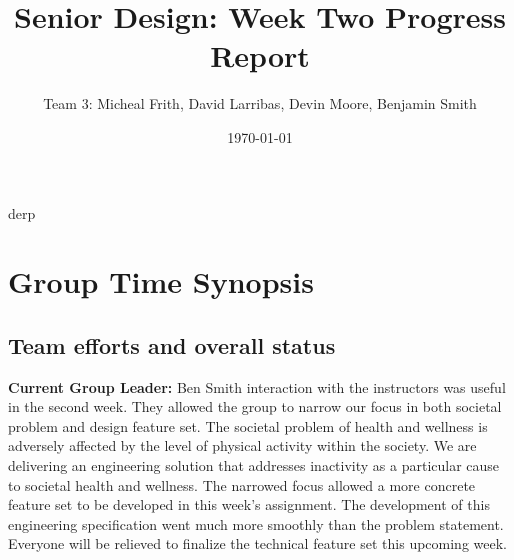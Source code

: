 \documentclass[12pt,article,compsoc]{IEEEtran}
\begin{document}
\title{Senior Design: Week Two Progress Report}
\author{Team 3: Micheal Frith, David Larribas, Devin Moore, Benjamin Smith}
\date{\today}
\maketitle

%
{derp}

\section{Group Time Synopsis}
	\subsection{Team efforts and overall status}
	{\bfseries Current Group Leader:} Ben Smith
	 interaction with the instructors was useful in the second week. They allowed 
	the group to narrow our focus in both societal problem and design feature set. The societal problem 
	of health and wellness is adversely affected by the level of physical activity within the society. 
	We are delivering an engineering solution that addresses inactivity as a particular cause to 
	societal health and wellness.  The narrowed focus allowed a more concrete feature set to be 
	developed in this week’s assignment. The development of this engineering specification went much 
	more smoothly than the problem statement. Everyone will be relieved to finalize the technical 
	feature set this upcoming week.
\end{document}
